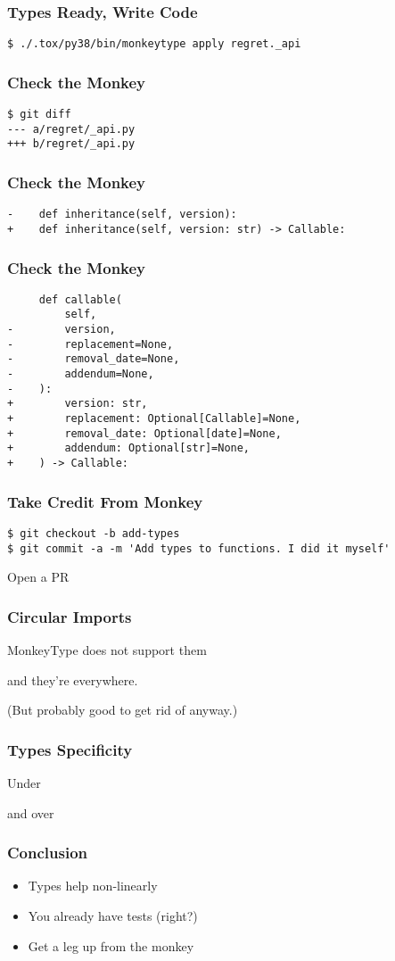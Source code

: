 \begin{frame}[fragile]
\frametitle{Types Ready, Write Code}
\begin{lstlisting}
$ ./.tox/py38/bin/monkeytype apply regret._api
\end{lstlisting}
\end{frame}

\begin{frame}[fragile]
\frametitle{Check the Monkey}
\begin{lstlisting}
$ git diff
--- a/regret/_api.py
+++ b/regret/_api.py
\end{lstlisting}
\end{frame}

\begin{frame}[fragile]
\frametitle{Check the Monkey}
\begin{lstlisting}
-    def inheritance(self, version):
+    def inheritance(self, version: str) -> Callable:
\end{lstlisting}
\end{frame}


\begin{frame}[fragile]
\frametitle{Check the Monkey}
\begin{lstlisting}
     def callable(
         self,
-        version,
-        replacement=None,
-        removal_date=None,
-        addendum=None,
-    ):
+        version: str,
+        replacement: Optional[Callable]=None,
+        removal_date: Optional[date]=None,
+        addendum: Optional[str]=None,
+    ) -> Callable:
\end{lstlisting}
\end{frame}

\begin{frame}[fragile]
\frametitle{Take Credit From Monkey}
\begin{lstlisting}
$ git checkout -b add-types
$ git commit -a -m 'Add types to functions. I did it myself'
\end{lstlisting} \pause

Open a PR
\end{frame}

\begin{frame}
\frametitle{Circular Imports}

MonkeyType does not support them\pause

and they're everywhere. \pause

(But probably good to get rid of anyway.)
\end{frame}


\begin{frame}
\frametitle{Types Specificity}

Under

\pause

and over

\end{frame}

\begin{frame}
\frametitle{Conclusion}

\begin{itemize}
\item Types help non-linearly
\item You already have tests (right?)
\item Get a leg up from the monkey
\end{itemize}
\end{frame}


